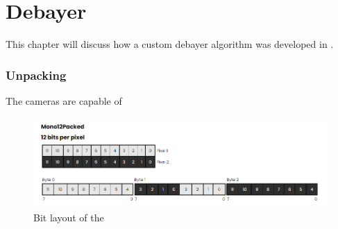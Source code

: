 \chapter{Debayer}
This chapter will discuss how a custom debayer algorithm was developed in \cuda.


\subsection{Unpacking}
The \lucid cameras are capable of
\begin{figure}
    \centering
    \includegraphics[width=\textwidth]{figures/Mono12Packed.png}
    \caption{Bit layout of the \cite{fisherRe15406LUT2023}}
    \label{fig:mono12packed}
\end{figure}


